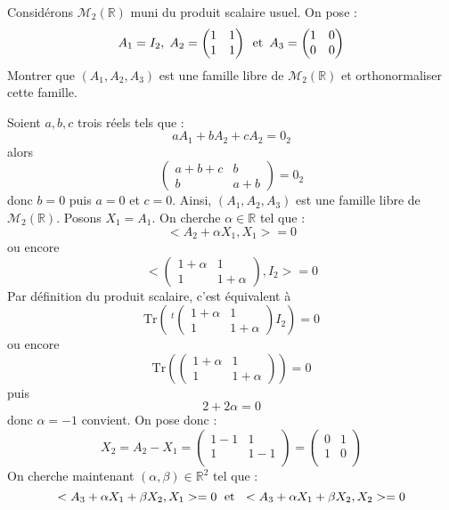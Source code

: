 \documentclass[a4paper,10pt]{report}
\begin{document}
\begin{Exercice}{} Considérons $\mathcal{M}_2(\mathbb{R})$ muni du produit scalaire usuel. On pose :
$$A_1 = I_2, \; A_2 = \begin{pmatrix}
1 & 1 \\
1 & 1 \\
\end{pmatrix} \, \hbox{ et } \, A_3 = \begin{pmatrix}
1 & 0 \\
0 & 0
\end{pmatrix}$$
Montrer que $(A_1,A_2,A_3)$ est une famille libre de $\mathcal{M}_2(\mathbb{R})$ et orthonormaliser cette famille.
\end{Exercice}

\corr Soient $a,b,c$ trois réels tels que :
$$ a A_1+bA_2+cA_2= 0_2$$
alors 
$$ \begin{pmatrix}
a+b+c & b \\
b & a+b
\end{pmatrix}=0_2$$
donc $b=0$ puis $a=0$ et $c=0$. Ainsi, $(A_1,A_2,A_3)$ est une famille libre de $\mathcal{M}_2(\mathbb{R})$. Posons $X_1=A_1$. On cherche $\alpha \in \mathbb{R}$ tel que :
$$ <A_2+ \alpha X_1, X_1>=0$$
ou encore 
$$ <\begin{pmatrix}
1+ \alpha & 1 \\
1 & 1+ \alpha
\end{pmatrix}, I_2>=0$$
Par définition du produit scalaire, c'est équivalent à
$$ \textrm{Tr} \left( ~^t{\begin{pmatrix} 1+ \alpha & 1 \\
1 & 1+ \alpha
\end{pmatrix}} I_2 \right)=0$$
ou encore 
$$ \textrm{Tr} \left( \begin{pmatrix} 1+ \alpha & 1 \\
1 & 1+ \alpha
\end{pmatrix} \right)=0$$
puis
$$ 2+ 2 \alpha=0$$
donc $\alpha=-1$ convient. On pose donc :
$$ X_2 = A_2 - X_1 = \begin{pmatrix}
1-1 & 1 \\
1 & 1-1\\
\end{pmatrix}
 = \begin{pmatrix}
0 & 1 \\
1 & 0 \\
\end{pmatrix}$$
On cherche maintenant $(\alpha, \beta) \in \mathbb{R}^2$ tel que :
$$ <A_3+ \alpha X_1+ \beta X_2, X_1>=0 \; \hbox{ et } \; <A_3+ \alpha X_1+ \beta X_2, X_2>=0$$
\end{document}
